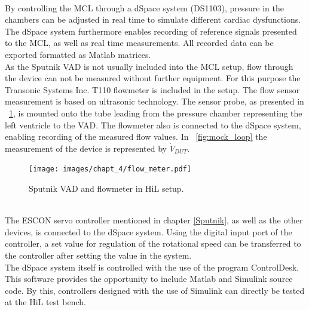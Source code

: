 \\By controlling the MCL through a dSpace system (DS1103), pressure in the chambers can be adjusted in real time to simulate different cardiac dysfunctions. The dSpace system furthermore enables recording of reference signals presented to the MCL, as well as real time measurements. All recorded data can be exported formatted as Matlab matrices.
\\As the Sputnik VAD is not usually included into the MCL setup, flow through the device can not be measured without further equipment. For this purpose the Transonic Systems Inc. T110 flowmeter is included in the setup. The flow sensor measurement is based on ultrasonic technology. The sensor probe, as presented in \figurename~\ref{fig:flow_meter_tube}, is mounted onto the tube leading from the pressure chamber representing the left ventricle to the VAD. The flowmeter also is connected to the dSpace system, enabling recording of the measured flow values. In \figurename~\ref{fig:mock_loop} the measurement of the device is represented by $\dot{V}_{DUT}$.
\begin{figure}[ht]
  \centering
  \texttt{[image: images/chapt\_4/flow\_meter.pdf]}
  \caption[Sputnik VAD and flowmeter in HiL setup]{Sputnik VAD and flowmeter in HiL setup.}
  \label{fig:flow_meter_tube}
\end{figure}
\\The ESCON servo controller mentioned in chapter \ref{Sputnik}, as well as the other devices, is connected to the dSpace system. Using the digital input port of the controller, a set value for regulation of the rotational speed can be transferred to the controller after setting the value in the system.
\\The dSpace system itself is controlled with the use of the program ControlDesk. This software provides the opportunity to include Matlab and Simulink source code. By this, controllers designed with the use of Simulink can directly be tested at the HiL test bench.

